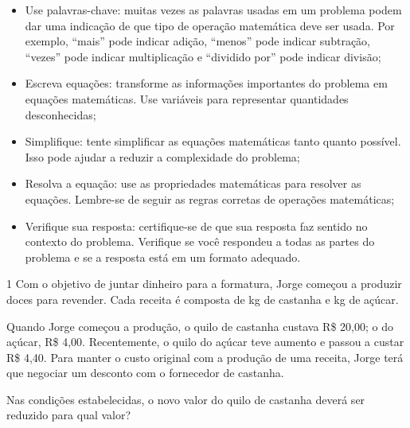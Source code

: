 {{{\begin{itemize}
  \item Use palavras-chave: muitas vezes as palavras usadas em um
problema podem dar uma indicação de que tipo de operação matemática deve
ser usada. Por exemplo, ``mais'' pode indicar adição, ``menos'' pode
indicar subtração, ``vezes'' pode indicar multiplicação e
``dividido por'' pode indicar divisão;

  \item Escreva equações: transforme as informações importantes do
problema em equações matemáticas. Use variáveis para representar
quantidades desconhecidas;

  \item Simplifique: tente simplificar as equações matemáticas tanto
quanto possível. Isso pode ajudar a reduzir a complexidade do problema;

  \item Resolva a equação: use as propriedades matemáticas para resolver
as equações. Lembre-se de seguir as regras corretas de operações
matemáticas;

  \item Verifique sua resposta: certifique-se de que sua resposta faz
sentido no contexto do problema. Verifique se você respondeu a todas as
partes do problema e se a resposta está em um formato adequado.
\end{itemize}
}


\num{1} Com o objetivo de juntar dinheiro para a formatura, Jorge começou a
produzir doces para revender. Cada receita é composta de  kg de 
castanha e  kg de açúcar.

Quando Jorge começou a produção, o quilo de castanha custava R\$ 20,00; o do
açúcar, R\$ 4,00. Recentemente, o quilo do açúcar teve aumento e passou a
custar R\$ 4,40. Para manter o custo original com a produção de uma receita, 
Jorge terá que negociar um desconto com o fornecedor de castanha.

Nas condições estabelecidas, o novo valor do quilo de castanha deverá ser
reduzido para qual valor?

}}
